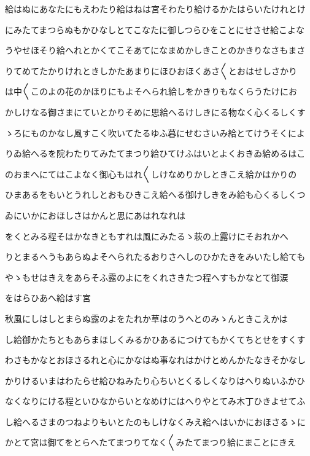 \documentclass[a4paper,11pt,landscape]{ltjtarticle}
\begin{document}
\par\medskip
給はぬにあなたにもえわたり給はねは宮そわたり給けるかたはらいたけれとけ
\par\medskip
にみたてまつらぬもかひなしとてこなたに御しつらひをことにせさせ給こよな
\par\medskip
うやせほそり給へれとかくてこそあてになまめかしきことのかきりなさもまさ
\par\medskip
りてめてたかりけれときしかたあまりにほひおほくあさ〱とおはせしさかり
\par\medskip
は中〱このよの花のかほりにもよそへられ給しをかきりもなくらうたけにお
\par\medskip
かしけなる御さまにていとかりそめに思給へるけしきにる物なく心くるしくす
\par\medskip
ゝろにものかなし風すこく吹いてたるゆふ暮にせむさいみ給とてけうそくによ
\par\medskip
りゐ給へるを院わたりてみたてまつり給ひてけふはいとよくおきゐ給めるはこ
\par\medskip
のおまへにてはこよなく御心もはれ〱しけなめりかしときこえ給かはかりの
\par\medskip
ひまあるをもいとうれしとおもひきこえ給へる御けしきをみ給も心くるしくつ
\par\medskip
ゐにいかにおほしさはかんと思にあはれなれは
\par\medskip
をくとみる程そはかなきともすれは風にみたるゝ萩の上露けにそおれかへ
\par\medskip
りとまるへうもあらぬよそへられたるおりさへしのひかたきをみいたし給ても
\par\medskip
やゝもせはきえをあらそふ露のよにをくれさきたつ程へすもかなとて御涙
\par\medskip
をはらひあへ給はす宮
\par\medskip
秋風にしはしとまらぬ露のよをたれか草はのうへとのみゝんときこえかは
\par\medskip
し給御かたちともあらまほしくみるかひあるにつけてもかくてちとせをすくす
\par\medskip
わさもかなとおほさるれと心にかなはぬ事なれはかけとめんかたなきそかなし
\par\medskip
かりけるいまはわたらせ給ひねみたり心ちいとくるしくなりはへりぬいふかひ
\par\medskip
なくなりにける程といひなからいとなめけにはへりやとてみ木丁ひきよせてふ
\par\medskip
し給へるさまのつねよりもいとたのもしけなくみえ給へはいかにおほさるゝに
\par\medskip
かとて宮は御てをとらへたてまつりてなく〱みたてまつり給にまことにきえ
\end{document}

